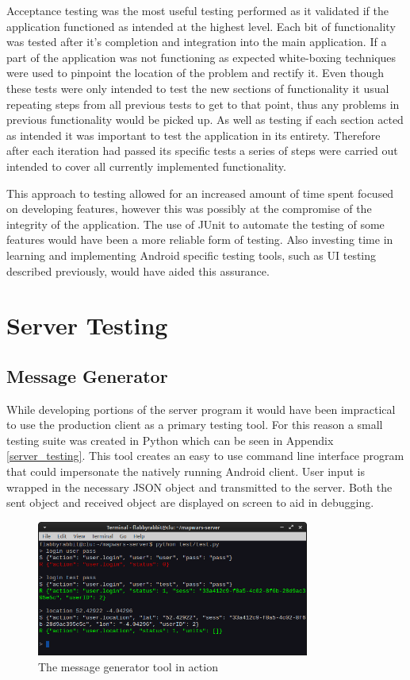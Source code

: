 Acceptance testing was the most useful testing performed as it validated if the application functioned as intended at the highest level. Each bit of functionality was tested after it's completion and integration into the main application. If a part of the application was not functioning as expected white-boxing techniques were used to pinpoint the location of the problem and rectify it. Even though these tests were only intended to test the new sections of functionality it usual repeating steps from all previous tests to get to that point, thus any problems in previous functionality would be picked up. As well as testing if each section acted as intended it was important to test the application in its entirety. Therefore after each iteration had passed its specific tests a series of steps were carried out intended to cover all currently implemented functionality.

This approach to testing allowed for an increased amount of time spent focused on developing features, however this was possibly at the compromise of the integrity of the application. The use of JUnit to automate the testing of some features would have been a more reliable form of testing. Also investing time in learning and implementing Android specific testing tools, such as UI testing described previously, would have aided this assurance.

\section{Server Testing}
\subsection{Message Generator}
While developing portions of the server program it would have been impractical to use the production client as a primary testing tool. For this reason a small testing suite was created in Python which can be seen in Appendix \ref{server_testing}. This tool creates an easy to use command line interface program that could impersonate the natively running Android client. User input is wrapped in the necessary JSON object and transmitted to the server. Both the sent object and received object are displayed on screen to aid in debugging. 

\begin{figure}[H]
  \centering
   \includegraphics[width=0.8\textwidth]{Images/test.png}
  \caption{The message generator tool in action}
  \label{fig:isogui}
\end{figure}

